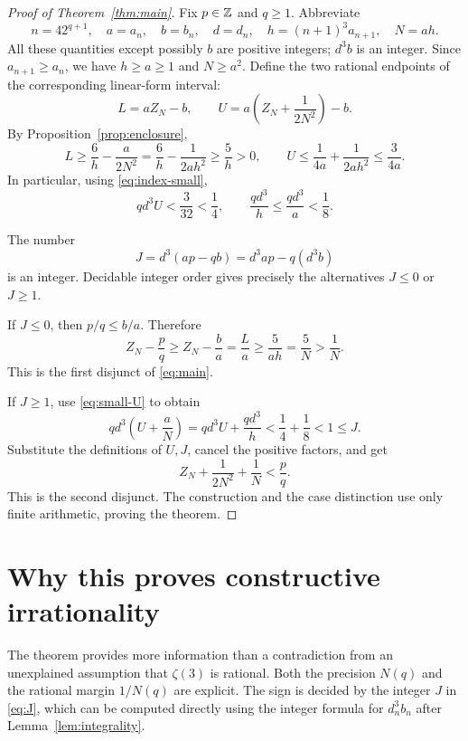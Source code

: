 \documentclass[11pt]{article}
\theoremstyle{definition}\newtheorem{definition}[theorem]{Definition}
\theoremstyle{remark}\newtheorem{remark}[theorem]{Remark}
\begin{document}
\begin{proof}[Proof of Theorem~\ref{thm:main}]
Fix $p\in\mathbb Z$ and $q\ge1$. Abbreviate
\[
 n=42^{q+1},\quad a=a_n,\quad b=b_n,\quad d=d_n,\quad
 h=(n+1)^3a_{n+1},\quad N=ah.
\]
All these quantities except possibly $b$ are positive integers; $d^3b$ is
an integer. Since $a_{n+1}\ge a_n$, we have $h\ge a\ge1$ and $N\ge a^2$.
Define the two rational endpoints of the corresponding linear-form interval:
\[
 L=aZ_N-b,\qquad U=a\left(Z_N+\frac1{2N^2}\right)-b.
\]
By Proposition~\ref{prop:enclosure},
\begin{equation}\label{eq:LU}
 L\ge\frac6h-\frac{a}{2N^2}
   =\frac6h-\frac1{2ah^2}\ge\frac5h>0,
 \qquad
 U\le\frac1{4a}+\frac1{2ah^2}\le\frac3{4a}.
\end{equation}
In particular, using \eqref{eq:index-small},
\begin{equation}\label{eq:small-U}
 qd^3U<\frac3{32}<\frac14,\qquad
 \frac{qd^3}{h}\le\frac{qd^3}{a}<\frac18.
\end{equation}

The number
\begin{equation}\label{eq:J}
 J=d^3(ap-qb)=d^3ap-q(d^3b)
\end{equation}
is an integer. Decidable integer order gives precisely the alternatives
$J\le0$ or $J\ge1$.

If $J\le0$, then $p/q\le b/a$. Therefore
\[
 Z_N-\frac pq\ge Z_N-\frac ba=\frac La
       \ge\frac5{ah}=\frac5N>\frac1N.
\]
This is the first disjunct of \eqref{eq:main}.

If $J\ge1$, use \eqref{eq:small-U} to obtain
\[
 qd^3\left(U+\frac aN\right)
 =qd^3U+\frac{qd^3}{h}<\frac14+\frac18<1\le J.
\]
Substitute the definitions of $U,J$, cancel the positive factors, and get
\[
 Z_N+\frac1{2N^2}+\frac1N<\frac pq.
\]
This is the second disjunct. The construction and the case distinction use
only finite arithmetic, proving the theorem.
\end{proof}

\section{Why this proves constructive irrationality}\label{sec:irrationality}
The theorem provides more information than a contradiction from an
unexplained assumption that $\zeta(3)$ is rational. Both the precision $N(q)$
and the rational margin $1/N(q)$ are explicit. The sign is decided by the
integer $J$ in \eqref{eq:J}, which can be computed directly using the integer
formula for $d_n^3b_n$ after Lemma~\ref{lem:integrality}.
\end{document}

